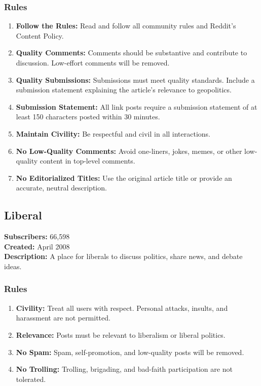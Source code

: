 \subsubsection{Rules}
\begin{enumerate}
    \item \textbf{Follow the Rules:} Read and follow all community rules and Reddit's Content Policy.
    
    \item \textbf{Quality Comments:} Comments should be substantive and contribute to discussion. Low-effort comments will be removed.
    
    \item \textbf{Quality Submissions:} Submissions must meet quality standards. Include a submission statement explaining the article's relevance to geopolitics.
    
    \item \textbf{Submission Statement:} All link posts require a submission statement of at least 150 characters posted within 30 minutes.
    
    \item \textbf{Maintain Civility:} Be respectful and civil in all interactions.
    
    \item \textbf{No Low-Quality Comments:} Avoid one-liners, jokes, memes, or other low-quality content in top-level comments.
    
    \item \textbf{No Editorialized Titles:} Use the original article title or provide an accurate, neutral description.
\end{enumerate}

\subsection{Liberal}
\textbf{Subscribers:} 66,598 \\
\textbf{Created:} April 2008 \\
\textbf{Description:} A place for liberals to discuss politics, share news, and debate ideas.

\subsubsection{Rules}
\begin{enumerate}
    \item \textbf{Civility:} Treat all users with respect. Personal attacks, insults, and harassment are not permitted.
    
    \item \textbf{Relevance:} Posts must be relevant to liberalism or liberal politics.
    
    \item \textbf{No Spam:} Spam, self-promotion, and low-quality posts will be removed.
    
    \item \textbf{No Trolling:} Trolling, brigading, and bad-faith participation are not tolerated.
\end{enumerate}

